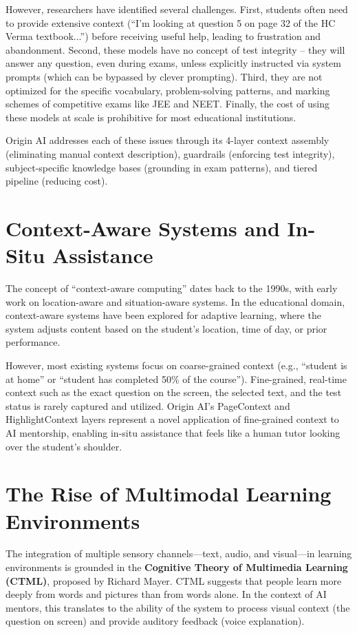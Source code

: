 However, researchers have identified several challenges. First, students often need to provide extensive context (``I'm looking at question 5 on page 32 of the HC Verma textbook...'') before receiving useful help, leading to frustration and abandonment. Second, these models have no concept of test integrity – they will answer any question, even during exams, unless explicitly instructed via system prompts (which can be bypassed by clever prompting). Third, they are not optimized for the specific vocabulary, problem-solving patterns, and marking schemes of competitive exams like JEE and NEET. Finally, the cost of using these models at scale is prohibitive for most educational institutions.

Origin AI addresses each of these issues through its 4-layer context assembly (eliminating manual context description), guardrails (enforcing test integrity), subject-specific knowledge bases (grounding in exam patterns), and tiered pipeline (reducing cost).

\section{Context-Aware Systems and In-Situ Assistance}

The concept of ``context-aware computing'' dates back to the 1990s, with early work on location-aware and situation-aware systems. In the educational domain, context-aware systems have been explored for adaptive learning, where the system adjusts content based on the student's location, time of day, or prior performance.

However, most existing systems focus on coarse-grained context (e.g., ``student is at home'' or ``student has completed 50\% of the course''). Fine-grained, real-time context such as the exact question on the screen, the selected text, and the test status is rarely captured and utilized. Origin AI's PageContext and HighlightContext layers represent a novel application of fine-grained context to AI mentorship, enabling in-situ assistance that feels like a human tutor looking over the student's shoulder.

\section{The Rise of Multimodal Learning Environments}

The integration of multiple sensory channels—text, audio, and visual—in learning environments is grounded in the \textbf{Cognitive Theory of Multimedia Learning (CTML)}, proposed by Richard Mayer. CTML suggests that people learn more deeply from words and pictures than from words alone. In the context of AI mentors, this translates to the ability of the system to process visual context (the question on screen) and provide auditory feedback (voice explanation).

